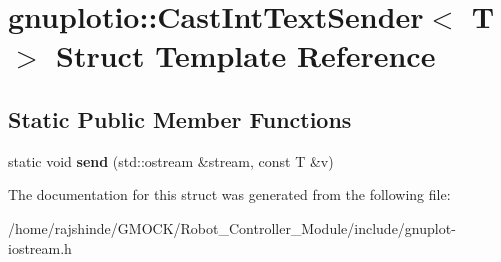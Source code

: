 \hypertarget{structgnuplotio_1_1_cast_int_text_sender}{}\section{gnuplotio\+:\+:Cast\+Int\+Text\+Sender$<$ T $>$ Struct Template Reference}
\label{structgnuplotio_1_1_cast_int_text_sender}
\subsection*{Static Public Member Functions}
\begin{DoxyCompactItemize}
\item 
static void {\bfseries send} (std\+::ostream \&stream, const T \&v)\hypertarget{structgnuplotio_1_1_cast_int_text_sender_a42733f83f843a375437e7e5f716ea65e}{}\label{structgnuplotio_1_1_cast_int_text_sender_a42733f83f843a375437e7e5f716ea65e}

\end{DoxyCompactItemize}


The documentation for this struct was generated from the following file\+:\begin{DoxyCompactItemize}
\item 
/home/rajshinde/\+G\+M\+O\+C\+K/\+Robot\+\_\+\+Controller\+\_\+\+Module/include/gnuplot-\/iostream.\+h\end{DoxyCompactItemize}
